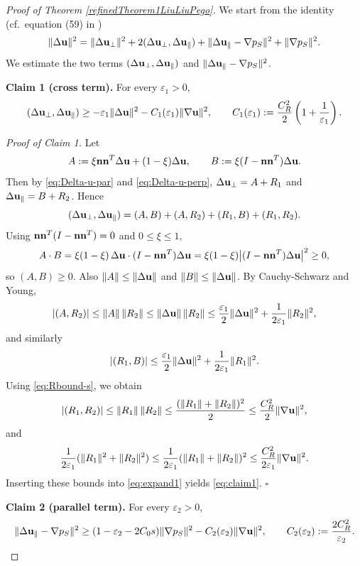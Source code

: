 \documentclass{article}
\theoremstyle{definition}                   %
\begin{document}
\begin{proof}[Proof of Theorem \ref{refinedTheorem1LiuLiuPego}]
We start from the identity (cf.\ equation (59) in \cite{LiuLiuPego2007})
\begin{equation}\label{eq:59}
\|\Delta{\bf u}\|^2
=
\|\Delta{\bf u}_\perp\|^2
+2(\Delta{\bf u}_\perp,\Delta{\bf u}_\parallel)
+\|\Delta{\bf u}_\parallel-\nabla p_S\|^2
+\|\nabla p_S\|^2 .
\end{equation}
We estimate the two terms
$(\Delta{\bf u}_\perp,\Delta{\bf u}_\parallel)$ and
$\|\Delta{\bf u}_\parallel-\nabla p_S\|^2$.

\medskip
\noindent
\textbf{Claim 1 (cross term).}
For every $\varepsilon_1>0$,
\begin{equation}\label{eq:claim1}
(\Delta{\bf u}_\perp,\Delta{\bf u}_\parallel)
\ge
-\varepsilon_1\|\Delta{\bf u}\|^2
- C_1(\varepsilon_1)\|\nabla{\bf u}\|^2,
\qquad
C_1(\varepsilon_1):=\frac{C_R^2}{2}\left(1+\frac{1}{\varepsilon_1}\right).
\end{equation}

\noindent
\emph{Proof of Claim 1.}
Let
\[
A:=\xi{\bf n}{\bf n}^T\Delta{\bf u}+(1-\xi)\Delta{\bf u},
\qquad
B:=\xi(I-{\bf n}{\bf n}^T)\Delta{\bf u}.
\]
Then by \eqref{eq:Delta-u-par} and \eqref{eq:Delta-u-perp}, $\Delta{\bf u}_\perp=A+R_1$ and $\Delta{\bf u}_\parallel=B+R_2$.
Hence
\begin{equation}\label{eq:expand1}
(\Delta{\bf u}_\perp,\Delta{\bf u}_\parallel)=(A,B)+(A,R_2)+(R_1,B)+(R_1,R_2).
\end{equation}
Using ${\bf n}{\bf n}^T(I-{\bf n}{\bf n}^T)=0$ and $0\le\xi\le 1$,
\[
A\cdot B
=
\xi(1-\xi)\,\Delta{\bf u}\cdot (I-{\bf n}{\bf n}^T)\Delta{\bf u}
=
\xi(1-\xi)\bigl|(I-{\bf n}{\bf n}^T)\Delta{\bf u}\bigr|^2\ge 0,
\]
so $(A,B)\ge 0$. Also $\|A\|\le\|\Delta{\bf u}\|$ and $\|B\|\le\|\Delta{\bf u}\|$.
By Cauchy-Schwarz and Young,
\[
|(A,R_2)|
\le \|A\|\,\|R_2\|
\le \|\Delta{\bf u}\|\,\|R_2\|
\le \frac{\varepsilon_1}{2}\|\Delta{\bf u}\|^2+\frac{1}{2\varepsilon_1}\|R_2\|^2,
\]
and similarly
\[
|(R_1,B)|\le \frac{\varepsilon_1}{2}\|\Delta{\bf u}\|^2+\frac{1}{2\varepsilon_1}\|R_1\|^2.
\]
Using \eqref{eq:Rbound-s}, we obtain
\[
|(R_1,R_2)|\le \|R_1\|\,\|R_2\|
\le \frac{(\|R_1\|+\|R_2\|)^2}{2}
\le \frac{C_R^2}{2} \|\nabla{\bf u}\|^2,
\]
and
\[
\frac{1}{2\varepsilon_1}(\|R_1\|^2+\|R_2\|^2)
\le
\frac{1}{2\varepsilon_1}(\|R_1\|+\|R_2\|)^2
\le 
 \frac{C_R^2}{2\varepsilon_1}\|\nabla{\bf u}\|^2.
\]
Inserting these bounds into \eqref{eq:expand1} yields \eqref{eq:claim1}.
\hfill$\square$

\medskip
\noindent
\textbf{Claim 2 (parallel term).}
For every $\varepsilon_2>0$,
\begin{equation}\label{eq:claim2}
\|\Delta{\bf u}_\parallel-\nabla p_S\|^2
\ge
(1-\varepsilon_2-2C_0 s)\|\nabla p_S\|^2
- C_2(\varepsilon_2)\|\nabla{\bf u}\|^2,
\qquad
C_2(\varepsilon_2):=\frac{2C_R^2}{\varepsilon_2}.
\end{equation}


\end{proof}
\end{document}

